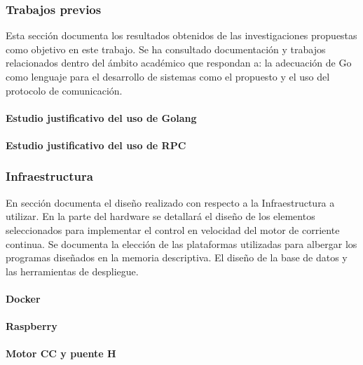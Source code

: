 \subsubsection{Trabajos previos}
Esta sección documenta los resultados obtenidos de las investigaciones propuestas como objetivo en este trabajo.
Se ha consultado documentación y trabajos relacionados dentro del ámbito académico que respondan a: la adecuación de Go como lenguaje para el desarrollo de sistemas como el propuesto y
el uso del protocolo de comunicación.

\paragraph{Estudio justificativo del uso de Golang}



\paragraph{Estudio justificativo del uso de RPC}


\subsubsection{Infraestructura}\label{subsubsec:infraestructura}

En sección documenta el diseño realizado con respecto a la Infraestructura a utilizar.
En la parte del hardware se detallará el diseño de los elementos seleccionados para implementar el control en velocidad del motor de corriente continua.
Se documenta la elección de las plataformas utilizadas para albergar los programas diseñados en la memoria descriptiva.
El diseño de la base de datos y las herramientas de despliegue.

\paragraph{Docker}\label{par:Docker}


\paragraph{Raspberry}


\paragraph{Motor CC y puente H}



